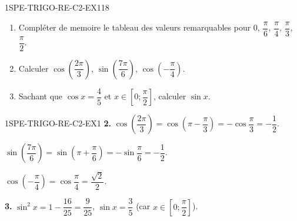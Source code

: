 

\begin{exercice}{1SPE-TRIGO-RE-C2-EX1}{1}{8}
\begin{enumerate}
  \item Compléter de memoire le tableau des valeurs remarquables pour $0$, $\dfrac{\pi}{6}$, $\dfrac{\pi}{4}$, $\dfrac{\pi}{3}$, $\dfrac{\pi}{2}$.
  \item Calculer $\cos\!\left(\dfrac{2\pi}{3}\right)$, $\sin\!\left(\dfrac{7\pi}{6}\right)$, $\cos\!\left(-\dfrac{\pi}{4}\right)$.
  \item Sachant que $\cos x = \dfrac{4}{5}$ et $x \in \left[0;\dfrac{\pi}{2}\right]$, calculer $\sin x$.
\end{enumerate}
\end{exercice}


\begin{corrige}{1SPE-TRIGO-RE-C2-EX1}
\textbf{2.} $\cos\!\left(\dfrac{2\pi}{3}\right) = \cos(\pi-\dfrac{\pi}{3}) = -\cos\dfrac{\pi}{3} = -\dfrac{1}{2}$.

$\sin\!\left(\dfrac{7\pi}{6}\right) = \sin(\pi+\dfrac{\pi}{6}) = -\sin\dfrac{\pi}{6} = -\dfrac{1}{2}$.

$\cos(-\dfrac{\pi}{4}) = \cos\dfrac{\pi}{4} = \dfrac{\sqrt{2}}{2}$.

\textbf{3.} $\sin^2 x = 1 - \dfrac{16}{25} = \dfrac{9}{25}$, $\sin x = \dfrac{3}{5}$ (car $x \in [0;\dfrac{\pi}{2}]$).
\end{corrige}
